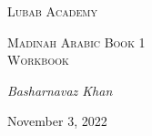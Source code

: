 \begin{titlepage}
	\centering
	{\scshape\Large Lubab Academy \par}
	\vspace{5cm}
	{\scshape\LARGE Madinah Arabic Book 1 \\ Workbook\par}
	\vfill

    {\Large\itshape Basharnavaz Khan\par}
    \vspace{2cm}
	{\large November 3, 2022\par}
	\cleardoublepage
\end{titlepage}